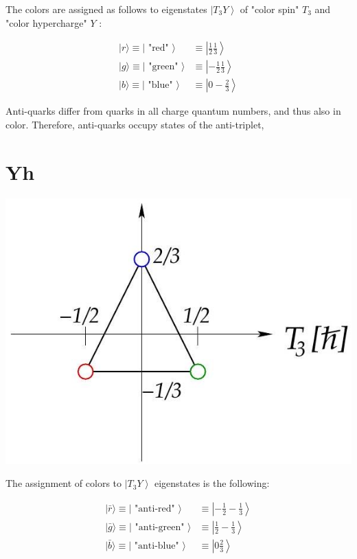 \documentclass[10pt, letterpaper]{article}
\begin{document}
The colors are assigned as follows to eigenstates $\left|T_{3} Y\right\rangle$ of "color spin" $T_{3}$ and "color hypercharge" $Y$ :

$$
\begin{aligned}
|r\rangle \equiv \mid \text { "red" }\rangle & \equiv\left|\frac{1}{2} \frac{1}{3}\right\rangle \\
|g\rangle \equiv \mid \text { "green" }\rangle & \equiv\left|-\frac{1}{2} \frac{1}{3}\right\rangle \\
|b\rangle \equiv \mid \text { "blue" }\rangle & \equiv\left|0-\frac{2}{3}\right\rangle
\end{aligned}
$$

Anti-quarks differ from quarks in all charge quantum numbers, and thus also in color. Therefore, anti-quarks occupy states of the anti-triplet,

\section{Yh}
\begin{center}
\includegraphics[scale=0.3]{2025_05_20_8618f55a41bfe980b4b2g-62}
\end{center}

The assignment of colors to $\left|T_{3} Y\right\rangle$ eigenstates is the following:

$$
\begin{aligned}
|\bar{r}\rangle \equiv \mid \text { "anti-red" }\rangle & \equiv\left|-\frac{1}{2}-\frac{1}{3}\right\rangle \\
|\bar{g}\rangle \equiv \mid \text { "anti-green" }\rangle & \equiv\left|\frac{1}{2}-\frac{1}{3}\right\rangle \\
|\bar{b}\rangle \equiv \mid \text { "anti-blue" }\rangle & \equiv\left|0 \frac{2}{3}\right\rangle
\end{aligned}
$$
\end{document}
